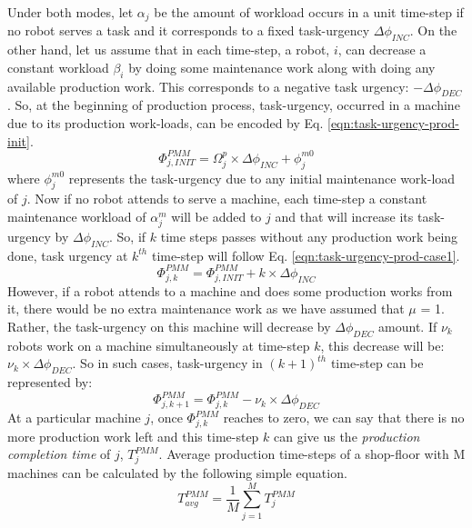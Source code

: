 \documentclass[final,5p,times,twocolumn]{elsarticle}
\begin{document}
Under both modes, let $\alpha_{j}$ be the amount of workload occurs in a unit time-step if no robot serves a task and it corresponds to a fixed task-urgency $\Delta \phi_{INC}$. On the other hand, let us assume that in each time-step, a robot, $i$, can decrease a constant workload $\beta_{i}$ by doing some maintenance work along with doing any available production work. This  corresponds to a negative task urgency: $- \Delta \phi_{DEC}$. So, at the beginning of production process, task-urgency, occurred in a machine due to its production work-loads, can be encoded by Eq. \ref{eqn:task-urgency-prod-init}.
\begin{equation}
\Phi_{j, INIT}^{PMM} = \Omega_{j}^{p} \times \Delta \phi_{INC} + \phi_{j}^{m0}
\label{eqn:task-urgency-prod-init}
\end{equation}
where $\phi_{j}^{m0}$ represents the task-urgency due to any initial maintenance work-load of $j$.
Now if no robot attends to serve a machine, each time-step a constant maintenance workload of $\alpha_{j}^{m}$ will be added to $j$ and that will increase its task-urgency by $\Delta \phi_{INC}$. So, if $k$ time steps passes without any production work being done, task urgency at $k^{th}$ time-step will follow Eq. \ref{eqn:task-urgency-prod-case1}.
\begin{equation}
\Phi_{j, k}^{PMM} =\Phi_{j, INIT}^{PMM} + k \times \Delta \phi_{INC}
\label{eqn:task-urgency-prod-case1}
\end{equation}
However, if a robot attends to a machine and does some production works from it, there would be no extra maintenance work as we have assumed that $\mu$ = 1. Rather, the task-urgency on this machine will decrease by $\Delta \phi_{DEC}$ amount. If $\nu_{k}$ robots work on a machine simultaneously at time-step $k$, this decrease will be: $\nu_{k} \times \Delta \phi_{DEC}$. So in such cases, task-urgency in $(k+1)^{th}$ time-step can be represented by:
\begin{equation}
\Phi_{j, k+1}^{PMM} = \Phi_{j, k}^{PMM} - \nu_{k} \times \Delta \phi_{DEC}
\label{eqn:task-urgency-prod-case2}
\end{equation}
At a particular machine $j$, once $\Phi_{j, k}^{PMM}$ reaches to zero, we can say that there is no more production work left and this time-step $k$ can give us the {\em production completion time} of $j$, $T_{j}^{PMM}$. Average production time-steps of a shop-floor with M machines can be calculated by the following simple equation.
\begin{equation}
T_{avg}^{PMM} = \frac{1}{M} \sum_{j=1}^{M} T_{j}^{PMM} 
\label{eqn:avg-pmm}
\end{equation}
\end{document}

